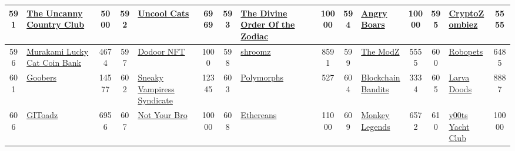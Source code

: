 \begin{table*}[]
{\begin{tabular}{|c|l|c|c|l|c|c|l|c|c|l|c|c|l|c|}
        591   & \href{https://theuncanny.io}{The Uncanny Country Club}                             & 5000              & 592   & \href{http://uncoolcats.com}{Uncool Cats}                                                         & 6969              & 593   & \href{https://thedivinezodiac.com/}{The Divine Order Of the Zodiac}               & 10000             & 594   & \href{https://angryboars.com}{Angry Boars}                                    & 10000             & 595   & \href{https://opensea.io/collection/ogczcollection}{CryptoZombiez}                        & 5555                                    \\ \hline
        596   & \href{https://murakamiflowers.kaikaikiki.com}{Murakami Lucky Cat Coin Bank}        & 4674              & 597   & \href{http://unlimitedd.io/}{Dodoor NFT}                                                          & 1000              & 598   & \href{https://shroomz.cool/}{shroomz}                                             & 8591              & 599   & \href{https://themodz.io}{The ModZ}                                           & 5555              & 600   & \href{https://www.robotos.art/robopets}{Robopets}                                         & 6485                                    \\ \hline
        601   & \href{http://goobers.net}{Goobers}                                                 & 14577             & 602   & \href{https://svs.gg}{Sneaky Vampiress Syndicate}                                                 & 12345             & 603   & \href{https://polymorphs.universe.xyz/}{Polymorphs}                               & 527               & 604   & \href{https://blockchainbanditsnft.com/}{Blockchain Bandits}                  & 3334              & 605   & \href{https://opensea.io/collection/larva-doods}{Larva Doods}                             & 8887                                    \\ \hline
        606   & \href{https://www.gitoadz.com/}{GIToadz}                                           & 6956              & 607   & \href{http://notyourbro.co}{Not Your Bro}                                                         & 10000             & 608   & \href{https://ethereans.xyz/}{Ethereans}                                          & 11000             & 609   & \href{http://www.monkeykingdom.io}{Monkey Legends}                            & 6572              & 610   & \href{https://opensea.io/collection/y00ts-yacht-club}{y00ts Yacht Club}                   & 10000                                   \\ \hline

\end{tabular}}
\end{table*}
